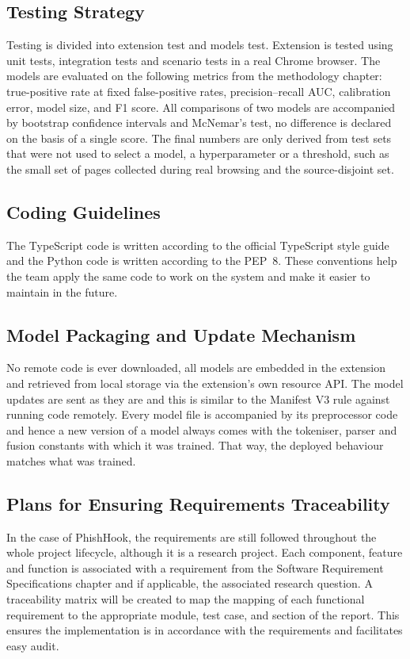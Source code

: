 \documentclass{FastFyp}
\begin{document}
\subsection{Testing Strategy}
Testing is divided into extension test and models test. Extension is tested using unit tests, integration tests and scenario tests in a real Chrome browser. The models are evaluated on the following metrics from the methodology chapter: true-positive rate at fixed false-positive rates, precision--recall AUC, calibration error, model size, and F1 score. All comparisons of two models are accompanied by bootstrap confidence intervals and McNemar's test, no difference is declared on the basis of a single score. The final numbers are only derived from test sets that were not used to select a model, a hyperparameter or a threshold, such as the small set of pages collected during real browsing and the source-disjoint set.

\subsection{Coding Guidelines}
The TypeScript code is written according to the official TypeScript style guide and the Python code is written according to the PEP~8. These conventions help the team apply the same code to work on the system and make it easier to maintain in the future.

\subsection{Model Packaging and Update Mechanism}
No remote code is ever downloaded, all models are embedded in the extension and retrieved from local storage via the extension's own resource API. The model updates are sent as they are and this is similar to the Manifest V3 rule against running code remotely. Every model file is accompanied by its preprocessor code and hence a new version of a model always comes with the tokeniser, parser and fusion constants with which it was trained. That way, the deployed behaviour matches what was trained.

\subsection{Plans for Ensuring Requirements Traceability}
In the case of PhishHook, the requirements are still followed throughout the whole project lifecycle, although it is a research project. Each component, feature and function is associated with a requirement from the Software Requirement Specifications chapter and if applicable, the associated research question. A traceability matrix will be created to map the mapping of each functional requirement to the appropriate module, test case, and section of the report. This ensures the implementation is in accordance with the requirements and facilitates easy audit.
\end{document}
